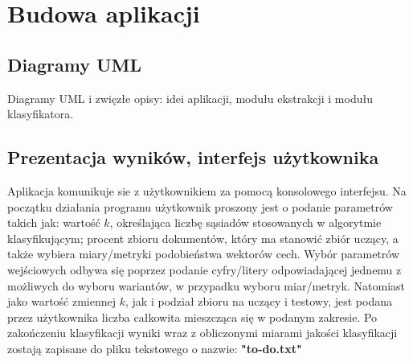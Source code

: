 \documentclass{classrep}
\begin{document}

\section{Budowa aplikacji}
\subsection{Diagramy UML}
Diagramy UML i zwięzłe opisy: idei aplikacji, modułu ekstrakcji i modułu
klasyfikatora.\\

\subsection{Prezentacja wyników, interfejs użytkownika}  
Aplikacja komunikuje sie z użytkownikiem za pomocą konsolowego interfejsu. Na początku działania programu użytkownik proszony jest o podanie parametrów takich jak:  
wartość $k$, określająca liczbę sąsiadów stosowanych w algorytmie klasyfikującym; 
procent zbioru dokumentów, który ma stanowić zbiór uczący, a także wybiera miary/metryki podobieństwa wektorów cech. Wybór parametrów wejściowych odbywa się poprzez podanie
cyfry/litery odpowiadającej jednemu z możliwych do wyboru wariantów, w przypadku wyboru miar/metryk. Natomiast jako wartość zmiennej $k$, jak i podział zbioru na uczący i testowy, jest podana przez użytkownika liczba całkowita mieszcząca się w podanym zakresie.
Po zakończeniu klasyfikacji wyniki wraz z obliczonymi miarami jakości klasyfikacji zostają zapisane do pliku tekstowego o nazwie: \textbf{"to-do.txt"}
\end{document}
